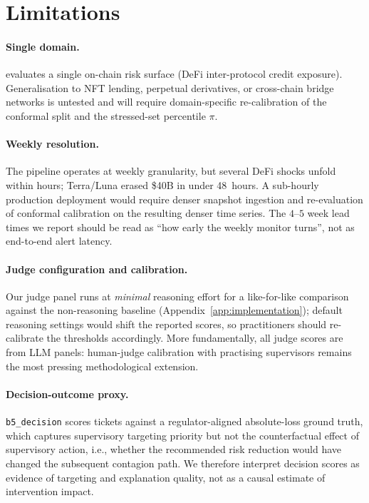 \section*{Limitations}
\label{sec:limitations}

\paragraph{Single domain.}
\benchname{} evaluates a single on-chain risk surface (DeFi
inter-protocol credit exposure). Generalisation to NFT lending,
perpetual derivatives, or cross-chain bridge networks is untested
and will require domain-specific re-calibration of the conformal
split and the stressed-set percentile $\pi$.

\paragraph{Weekly resolution.}
The pipeline operates at weekly granularity, but several DeFi shocks
unfold within hours; Terra/Luna erased \$40B in under 48~hours. A
sub-hourly production deployment would require denser snapshot
ingestion and re-evaluation of conformal calibration on the
resulting denser time series. The $4$--$5$ week lead times we
report should be read as ``how early the weekly monitor turns'',
not as end-to-end alert latency.

\paragraph{Judge configuration and calibration.}
Our judge panel runs at \emph{minimal} reasoning effort for a
like-for-like comparison against the non-reasoning baseline
(Appendix~\ref{app:implementation}); default reasoning settings would
shift the reported scores, so practitioners should re-calibrate the
thresholds accordingly. More fundamentally, all judge scores are from
LLM panels: human-judge calibration with practising supervisors
remains the most pressing methodological extension.

\paragraph{Decision-outcome proxy.}
\texttt{b5\_decision} scores tickets against a regulator-aligned
absolute-loss ground truth, which captures supervisory targeting
priority but not the counterfactual effect of supervisory
action, i.e., whether the recommended risk reduction would have
changed the subsequent contagion path. We therefore interpret decision
scores as evidence of targeting and explanation quality, not as a
causal estimate of intervention impact.
